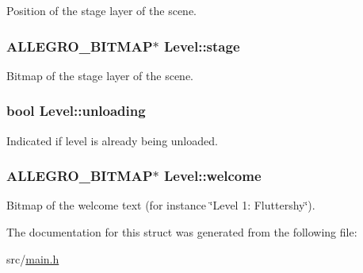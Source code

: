 Position of the stage layer of the scene. \hypertarget{structLevel_ad412b858a4e688114dd89a44ecb005bb}{
\subsubsection[{stage}]{\setlength{\rightskip}{0pt plus 5cm}A\-L\-L\-E\-G\-R\-O\-\_\-\-B\-I\-T\-M\-A\-P$\ast$ Level\-::stage}}\label{structLevel_ad412b858a4e688114dd89a44ecb005bb}
Bitmap of the stage layer of the scene. \hypertarget{structLevel_a058680deb984491fa71d2f212f8025ae}{
\subsubsection[{unloading}]{\setlength{\rightskip}{0pt plus 5cm}bool Level\-::unloading}}\label{structLevel_a058680deb984491fa71d2f212f8025ae}
Indicated if level is already being unloaded. \hypertarget{structLevel_a575fec7686bd94b5c35b15d73296c977}{
\subsubsection[{welcome}]{\setlength{\rightskip}{0pt plus 5cm}A\-L\-L\-E\-G\-R\-O\-\_\-\-B\-I\-T\-M\-A\-P$\ast$ Level\-::welcome}}\label{structLevel_a575fec7686bd94b5c35b15d73296c977}
Bitmap of the welcome text (for instance \char`\"{}\-Level 1\-: Fluttershy\char`\"{}). 

The documentation for this struct was generated from the following file\-:\begin{DoxyCompactItemize}
\item 
src/\hyperlink{main_8h}{main.\-h}\end{DoxyCompactItemize}
